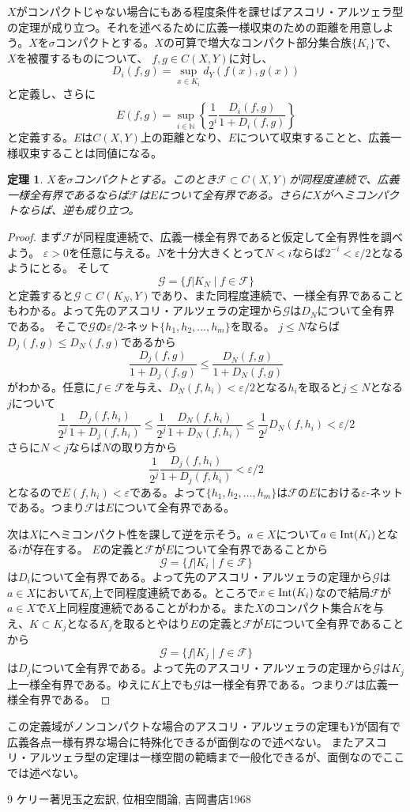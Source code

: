 \documentclass[leqno]{jsarticle}
\newtheorem{thm}{定理}
\newcommand{\nn}{\mathbb{N}}
\newcommand{\ep}{\varepsilon}
\newcommand{\nai}{\text{{\rm Int}}}
\begin{document}
$X$がコンパクトじゃない場合にもある程度条件を課せばアスコリ・アルツェラ型の定理が成り立つ。それを述べるために広義一様収束のための距離を用意しよう。$X$を$\sigma$コンパクトとする。$X$の可算で増大なコンパクト部分集合族$\{K_i\}$で、$X$を被覆するものについて、
$f,g\in C(X,Y)$に対し、
\[
D_i(f,g)=\sup_{x\in K_i}d_Y(f(x), g(x))
\]
と定義し、さらに
\[
E(f,g)=\sup_{i\in \nn}\left\{\frac{1}{2^i}\frac{D_i(f,g)}{1+D_i(f,g)}\right\}
\]
と定義する。$E$は$C(X,Y)$上の距離となり、$E$について収束することと、広義一様収束することは同値になる。
\begin{thm}
$X$を$\sigma$コンパクトとする。このとき$\mathcal{F}\subset C(X,Y)$が同程度連続で、広義一様全有界であるならば$\mathcal{F}$は$E$について全有界である。さらに$X$がヘミコンパクトならば、逆も成り立つ。
\end{thm}
\begin{proof}
まず$\mathcal{F}$が同程度連続で、広義一様全有界であると仮定して全有界性を調べよう。
$\ep>0$を任意に与える。$N$を十分大きくとって$N<i$ならば$2^{-i}<\ep/2$となるようにとる。
そして
\[
\mathcal{G}=\{f|K_N\mid f\in \mathcal{F}\}
\]
と定義すると$\mathcal{G}\subset C(K_N,Y)$であり、また同程度連続で、一様全有界であることもわかる。よって先のアスコリ・アルツェラの定理から$\mathcal{G}$は$D_N$について全有界である。
そこで$\mathcal{G}$の$\ep/2$-ネット$\{h_1,h_2,\dots, h_m\}$を取る。
$j\le N$ならば$D_j(f,g)\le D_N(f,g)$であるから
\[
\frac{D_j(f,g)}{1+D_j(f,g)}\le \frac{D_N(f,g)}{1+D_N(f,g)}
\]
がわかる。任意に$f\in \mathcal{F}$を与え、$D_N(f,h_i)<\ep/2$となる$h_i$を取ると$j\le N$となる$j$について
\[
\frac{1}{2^j}\frac{D_j(f,h_i)}{1+D_j(f,h_i)}\le \frac{1}{2^j}\frac{D_N(f,h_i)}{1+D_N(f,h_i)}\le 
\frac{1}{2^j}D_N(f,h_i)<\ep/2
\]
さらに$N<j$ならば$N$の取り方から
\[
\frac{1}{2^j}\frac{D_j(f,h_i)}{1+D_j(f,h_i)}<\ep/2
\]
となるので$E(f,h_i)<\ep$である。よって$\{h_1,h_2,\dots, h_m\}$は$\mathcal{F}$の$E$における$\ep$-ネットである。つまり$\mathcal{F}$は$E$について全有界である。
\par
次は$X$にヘミコンパクト性を課して逆を示そう。$a\in X$について$a\in \nai(K_i)$となる$i$が存在する。
$E$の定義と$\mathcal{F}$が$E$について全有界であることから
\[
\mathcal{G}=\{f|K_i\mid f\in \mathcal{F}\}
\]
は$D_i$について全有界である。よって先のアスコリ・アルツェラの定理から$\mathcal{G}$は$a\in X$において$K_i$上で同程度連続である。ところで$x\in \nai(K_i)$なので結局$\mathcal{F}$が$a\in X$で$X$上同程度連続であることがわかる。また$X$のコンパクト集合$K$を与え、$K\subset K_j$となる$K_j$を取るとやはり$E$の定義と$\mathcal{F}$が$E$について全有界であることから
\[
\mathcal{G}=\{f|K_j\mid f\in \mathcal{F}\}
\]
は$D_j$について全有界である。よって先のアスコリ・アルツェラの定理から$\mathcal{G}$は$K_j$上一様全有界である。ゆえに$K$上でも$\mathcal{G}$は一様全有界である。つまり$\mathcal{F}$は広義一様全有界である。
\end{proof}
この定義域がノンコンパクトな場合のアスコリ・アルツェラの定理も$Y$が固有で広義各点一様有界な場合に特殊化できるが面倒なので述べない。
またアスコリ・アルツェラ型の定理は一様空間の範疇まで一般化できるが、面倒なのでここでは述べない。











	
\begin{thebibliography}{9}
ケリー著児玉之宏訳, 位相空間論, 吉岡書店1968
\end{thebibliography}




			
\end{document}
